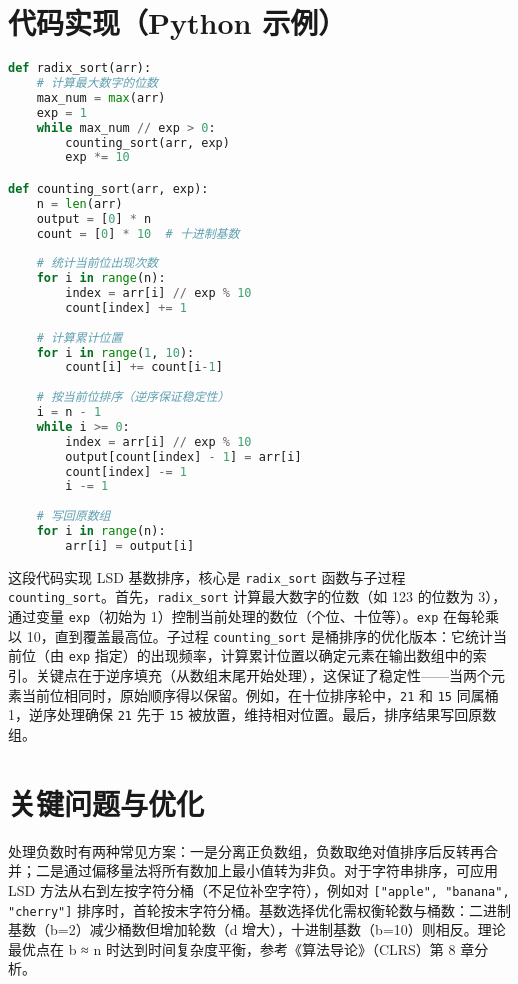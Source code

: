 \chapter{代码实现（Python 示例）}
\begin{lstlisting}[language=python]
def radix_sort(arr):
    # 计算最大数字的位数
    max_num = max(arr)
    exp = 1
    while max_num // exp > 0:
        counting_sort(arr, exp)
        exp *= 10

def counting_sort(arr, exp):
    n = len(arr)
    output = [0] * n
    count = [0] * 10  # 十进制基数
    
    # 统计当前位出现次数
    for i in range(n):
        index = arr[i] // exp % 10
        count[index] += 1
    
    # 计算累计位置
    for i in range(1, 10):
        count[i] += count[i-1]
    
    # 按当前位排序（逆序保证稳定性）
    i = n - 1
    while i >= 0:
        index = arr[i] // exp % 10
        output[count[index] - 1] = arr[i]
        count[index] -= 1
        i -= 1
    
    # 写回原数组
    for i in range(n):
        arr[i] = output[i]
\end{lstlisting}
这段代码实现 LSD 基数排序，核心是 \texttt{radix\_{}sort} 函数与子过程 \texttt{counting\_{}sort}。首先，\texttt{radix\_{}sort} 计算最大数字的位数（如 123 的位数为 3），通过变量 \texttt{exp}（初始为 1）控制当前处理的数位（个位、十位等）。\texttt{exp} 在每轮乘以 10，直到覆盖最高位。子过程 \texttt{counting\_{}sort} 是桶排序的优化版本：它统计当前位（由 \texttt{exp} 指定）的出现频率，计算累计位置以确定元素在输出数组中的索引。关键点在于逆序填充（从数组末尾开始处理），这保证了稳定性——当两个元素当前位相同时，原始顺序得以保留。例如，在十位排序轮中，\texttt{21} 和 \texttt{15} 同属桶 1，逆序处理确保 \texttt{21} 先于 \texttt{15} 被放置，维持相对位置。最后，排序结果写回原数组。\par
\chapter{关键问题与优化}
处理负数时有两种常见方案：一是分离正负数组，负数取绝对值排序后反转再合并；二是通过偏移量法将所有数加上最小值转为非负。对于字符串排序，可应用 LSD 方法从右到左按字符分桶（不足位补空字符），例如对 \texttt{["apple", "banana", "cherry"]} 排序时，首轮按末字符分桶。基数选择优化需权衡轮数与桶数：二进制基数（b=2）减少桶数但增加轮数（d 增大），十进制基数（b=10）则相反。理论最优点在 b ≈ n 时达到时间复杂度平衡，参考《算法导论》（CLRS）第 8 章分析。\par
